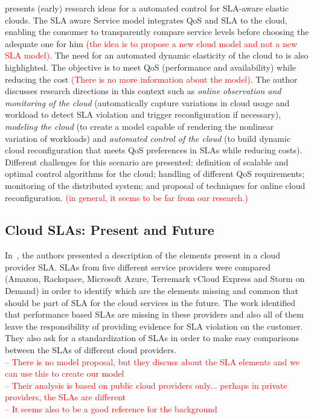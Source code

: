 \documentclass[12pt,a4paper,oneside]{article}
\begin{document}
\cite{013} presents (early) research ideas for a automated control for SLA-aware elastic clouds. The SLA aware Service model integrates QoS and SLA to the cloud, enabling the consumer to transparently compare service levels before choosing the adequate one for him \textcolor{red}{(the idea is to propose a new cloud model and not a new SLA model)}. The need for an automated dynamic elasticity of the cloud to is also highlighted. The objective is to meet QoS (performance and availability) while reducing the cost \textcolor{red}{(There is no more information about the model)}. The author discusses research directions in this context such as \textit{online observation and monitoring of the cloud} (automatically capture variations in cloud usage and workload to detect SLA violation and trigger reconfiguration if necessary), \textit{modeling the cloud} (to create a model capable of rendering the nonlinear variation of workloads) and \textit{automated control of the cloud} (to build dynamic cloud reconfiguration that meets QoS preferences in SLAs while reducing costs). Different challenges for this scenario are presented: definition of scalable and optimal control algorithms for the cloud; handling of different QoS requirements; monitoring of the distributed system; and proposal of techniques for online cloud reconfiguration. \textcolor{red}{(in general, it seems to be far from our research.)}

\subsection{Cloud SLAs: Present and Future}

In~\cite{010}, the authors presented a description of the elements present in a cloud provider SLA. SLAs from five different service providers were compared (Amazon, Rackspace, Microsoft Azure, Terremark vCloud Express and Storm on Demand) in order to identify which are the elements missing and common that should be part of SLA for the cloud services in the future. The work identified that performance based SLAs are missing in these providers and also all of them leave the responsibility of providing evidence for SLA violation on the customer. They also ask for a standardization of SLAs in order to make easy comparisons between the SLAs of different cloud providers. \\
\textcolor{red}{-- There is no model proposal, but they discuss about the SLA elements and we can use this to create our model \\
-- Their analysis is based on public cloud providers only... perhaps in private providers, the SLAs are different \\
-- It seems also to be a good reference for the background}
\end{document}
